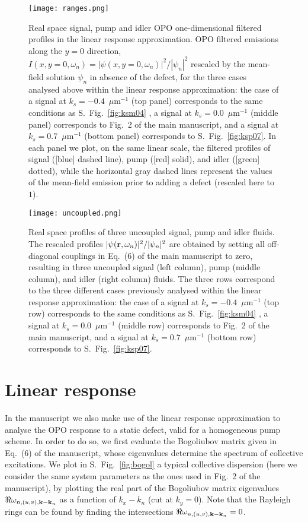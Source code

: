 %
\begin{figure}[tb]\centering
\texttt{[image: ranges.png]}
\caption{Real space signal, pump and idler OPO
  one-dimensional filtered profiles in the linear response
  approximation. OPO filtered emissions along the $y=0$ direction, $I
  (x, y=0, \omega_n) = |\psi(x,y=0, \omega_n)|^2/|\psi_n|^2$ rescaled
  by the mean-field solution $\psi_n$ in absence of the defect, for
  the three cases analysed above within the linear response
  approximation: the case of a signal at $k_s = -0.4$~$\mu$m$^{-1}$
  (top panel) corresponds to the same conditions as
  S.~Fig.~\ref{fig:ksm04} , a signal at $k_s = 0.0$~$\mu$m$^{-1}$
  (middle panel) corresponds to Fig.~2 of the main manuscript, and a
  signal at $k_s = 0.7$~$\mu$m$^{-1}$ (bottom panel) corresponds to
  S.~Fig.~\ref{fig:ksp07}. In each panel we plot, on the same linear
  scale, the filtered profiles of signal ([blue] dashed line), pump
  ([red] solid), and idler ([green] dotted), while the horizontal gray
  dashed lines represent the values of the mean-field emission prior
  to adding a defect (rescaled here to $1$).}
\label{fig:range}
\end{figure}
%
\begin{figure}[tb]\centering
\texttt{[image: uncoupled.png]}
\caption{Real space profiles of three uncoupled signal, pump and idler
  fluids. The rescaled profiles $|\psi
  (\mathbf{r},\omega_n)|^2/|\psi_n|^2$ are obtained by setting all
  off-diagonal couplings in Eq.~(6) of the main manuscript to zero,
  resulting in three uncoupled signal (left column), pump (middle
  column), and idler (right column) fluids. The three rows correspond
  to the three different cases previously analysed within the linear
  response approximation: the case of a signal at $k_s =
  -0.4$~$\mu$m$^{-1}$ (top row) corresponds to the same conditions as
  S.~Fig.~\ref{fig:ksm04} , a signal at $k_s = 0.0$~$\mu$m$^{-1}$
  (middle row) corresponds to Fig.~2 of the main manuscript, and a
  signal at $k_s = 0.7$~$\mu$m$^{-1}$ (bottom row) corresponds to
  S.~Fig.~\ref{fig:ksp07}.}
\label{fig:uncou}
\end{figure}
%
\section{Linear response}
\label{sec:analy}
%
In the manuscript we also make use of the linear response
approximation to analyse the OPO response to a static defect, valid
for a homogeneous pump scheme. In order to do so, we first evaluate
the Bogoliubov matrix given in Eq.~(6) of the manuscript, whose
eigenvalues determine the spectrum of collective excitations. We plot
in S.~Fig.~\ref{fig:bogol} a typical collective dispersion (here we
consider the same system parameters as the ones used in Fig.~2 of the
manuscript), by plotting the real part of the Bogoliubov matrix
eigenvalues $\Re \omega_{n,(u,v),\mathbf{k}-\mathbf{k}_n}$ as a function
of $k_x - k_n$ (cut at $k_y=0$). Note that the Rayleigh rings can be
found by finding the intersections $\Re
\omega_{n,(u,v),\mathbf{k}-\mathbf{k}_n}=0$.


